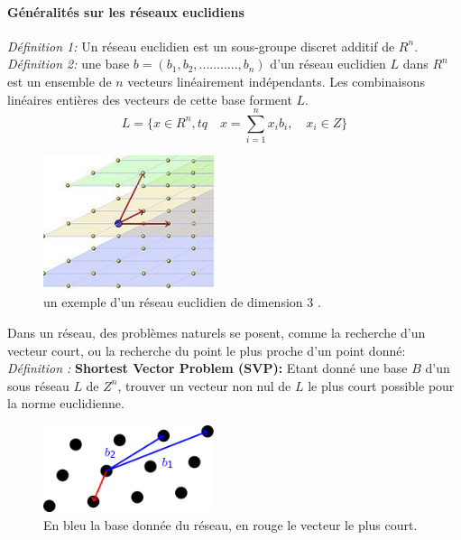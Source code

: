 \documentclass[a4paper,12pt]{article}
\begin{document}
\paragraph{Généralités sur les réseaux euclidiens}
\textit{ Définition 1:} Un réseau euclidien est un sous-groupe discret additif de $R^n$.\newline
\newline
\textit{ Définition 2:} une base $b= (b_1,b_2,...........,b_n)$  d’un réseau euclidien $L$ dans $R^n$ est un ensemble de $n$ vecteurs 
linéairement indépendants. Les combinaisons linéaires entières des vecteurs de cette base forment $L$.
$$L = \{x\in R^n, tq\quad x = \sum_{i=1}^{n} x_ib_i,\quad x_i\in Z\}$$
\newline
\newline    

\begin{figure}[h!]\begin{center}
    \includegraphics[width=5cm]{reseau.jpg}
    \caption{un exemple d'un réseau euclidien de dimension 3 .}
    \label{fig:reseau}
  \end{center}
  \end{figure}
Dans un réseau, des problèmes naturels se posent, comme la recherche d’un vecteur court, ou la recherche du point le plus proche d’un point donné: \newline
\textit{Définition :} \textbf{Shortest Vector Problem (SVP):}\newline
Etant donné une base $B$ d’un sous réseau $L$ de $Z^n$, trouver un vecteur non nul de $L$ le plus court possible pour la norme euclidienne.\newline
\newline
\newline
\begin{figure}[h!]\begin{center}
    \includegraphics[width=5cm]{svp.png}
    \caption{En bleu la base donnée du réseau, en rouge le vecteur le plus court.}
    \label{fig:svp}
  \end{center}
  \end{figure}
\end{document}
